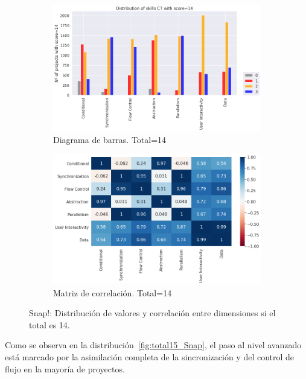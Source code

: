 \documentclass[a4paper, 12pt]{book}
\begin{document}
\begin{figure}[H]
    \centering
    \begin{subfigure}[h]{.49\textwidth} 
        \includegraphics[width=\textwidth]{img/distribucion_14_Snap}
        \caption{Diagrama de barras. Total=14}
        \label{fig:total14_Snap}
    \end{subfigure}       
    \begin{subfigure}[h]{.49\textwidth} 
        \includegraphics[width=\textwidth]{img/corr_14_Snap}
        \caption{Matriz de correlación. Total=14}
        \label{fig:corr14_Snap}
    \end{subfigure}
    \caption{Snap!: Distribución de valores y correlación entre dimensiones si el total es 14.}
\end{figure}

Como se observa en la distribución~\ref{fig:total15_Snap}, el paso al nivel avanzado está marcado por la asimilación completa de la sincronización y del control de flujo en la mayoría de proyectos.   
\end{document}
